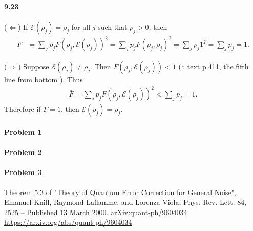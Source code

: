 \paragraph{9.23}
($\Leftarrow$)
If $\mathcal{E}(\rho_j) = \rho_j$ for all $j$ such that $p_j > 0$, then
\begin{align*}
    \bar{F} &= \sum_j p_j F(\rho_j, \mathcal{E}(\rho_j))^2 = \sum_j p_j F(\rho_j, \rho_j)^2 = \sum_j p_j 1^2 = \sum_j p_j = 1.
\end{align*}

($\Rightarrow$) Suppose $\mathcal{E}(\rho_j) \neq \rho_j$.  Then $F(\rho_j, \mathcal{E}(\rho_j)) < 1$ ($\because$  text p.411, the fifth line from bottom ).
Thus
\begin{align*}
    \bar{F} = \sum_j p_j F(\rho_j, \mathcal{E}(\rho_j))^2 < \sum_j p_j = 1.
\end{align*}
Therefore if $\bar{F} = 1$, then $\mathcal{E}(\rho_j) = \rho_j$.


\paragraph{Problem 1}
\paragraph{Problem 2}

\paragraph{Problem 3}
Theorem 5.3 of
"Theory of Quantum Error Correction for General Noise",
Emanuel Knill, Raymond Laflamme, and Lorenza Viola,
Phys. Rev. Lett. 84, 2525 – Published 13 March 2000.
arXiv:quant-ph/9604034
\url{https://arxiv.org/abs/quant-ph/9604034}